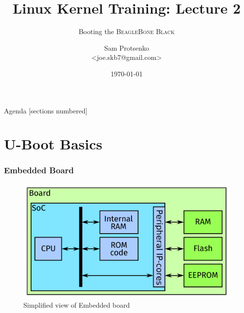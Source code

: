 

\title{Linux Kernel Training: Lecture 2}
\subtitle{Booting the \textsc{BeagleBone Black}}
\author{Sam Protsenko \texorpdfstring{\\ <joe.skb7@gmail.com>}{}}
\date{\vspace*{5mm}\today}



\maketitle

\begin{frame}{Agenda}
  [sections numbered]
  \tableofcontents[hideallsubsections]
\end{frame}

\section{U-Boot Basics}

\begin{frame}
  \frametitle{Embedded Board}
  \begin{figure}
    \centering
    \includegraphics[scale=0.33]{images/board.pdf}
    \caption{Simplified view of Embedded board}
  \end{figure}
\end{frame}


